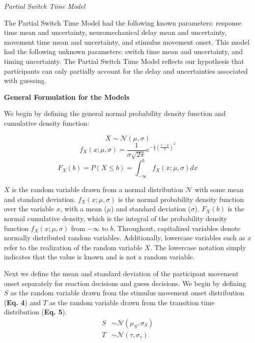 \documentclass[12pt]{article}
\newcommand\boldblue[1]{\textcolor{mydarkblue}{\textbf{#1}}}
\begin{document}
\vspace{2mm}
\noindent \emph{Partial Switch Time Model}

\noindent The Partial Switch Time Model had the following known parameters: response time mean and uncertainty, neuromechanical delay mean and uncertainty, movement time mean and uncertainty, and stimulus movement onset. This model had the following unknown parameters: switch time mean and uncertainty, and timing uncertainty. The Partial Switch Time Model reflects our hypothesis that participants can only partially account for the delay and uncertainties associated with guessing.

\vspace{2mm}
\noindent \boldblue{General Formulation for the Models}

\noindent We begin by defining the general normal probability density function and cumulative density function:
\setlength{\belowdisplayskip}{4pt} \setlength{\belowdisplayshortskip}{4pt} %
\setlength{\abovedisplayskip}{4pt} \setlength{\abovedisplayshortskip}{4pt}

\setcounter{equation}{0}

\begin{equation}
    X\sim\mathcal{N}(\mu,\sigma)
\end{equation}
\begin{equation}
    f_{X}(x; \mu, \sigma) = \frac{1}{\sigma\sqrt{2\pi}}e^{-\frac{1}{2}(\frac{x-\mu}{\sigma})^2}
\end{equation}
\begin{equation}
    F_{X}(b) = P(X \leq b) = \int_{-\infty}^{b} f_{X}(x; \mu, \sigma)dx
\end{equation}

$X$ is the random variable drawn from a normal distribution $\mathcal{N}$ with some mean and standard deviation. $f_{X}(x;\mu,\sigma)$ is the normal probability density function over the variable $x$, with a mean ($\mu$) and standard deviation ($\sigma$). $F_{X}(b)$ is the normal cumulative density, which is the integral of the probability density function $f_{X}(x;\mu,\sigma)$ from $-\infty$ to $b$. Throughout, capitalized variables denote normally distributed random variables. Additionally, lowercase variables such as $x$ refer to the realization of the random variable $X$. The lowercase notation simply indicates that the value is known and is not a random variable.

Next we define the mean and standard deviation of the participant movement onset separately for reaction decisions and guess decisions. We begin by defining $S$ as the random variable drawn from the stimulus movement onset distribution (\boldblue{Eq. 4}) and $T$ as the random variable drawn from the transition time distribution (\boldblue{Eq. 5}).
\begin{align}
    S & \sim\mathcal{N}(\mu_{S},\sigma_{S}) \\
    T & \sim\mathcal{N}(\tau,\sigma_{\tau})
\end{align}
\end{document}
